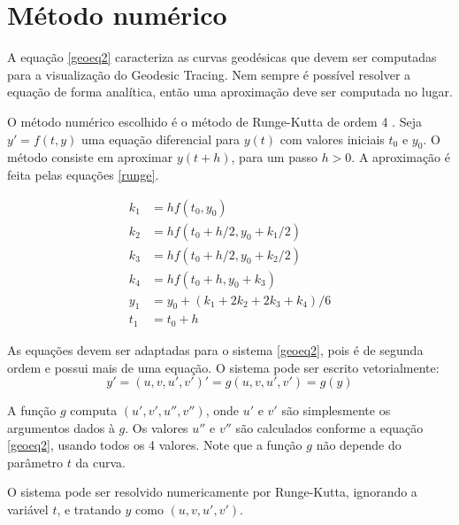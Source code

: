 \chapter{Método numérico}
\label{numeric}

A equação \ref{geoeq2} caracteriza as curvas geodésicas que devem ser 
computadas para a visualização do Geodesic Tracing.
Nem sempre é possível resolver a equação de forma analítica, então uma aproximação
deve ser computada no lugar.

O método numérico escolhido é o método de Runge-Kutta de ordem 4 \cite{Anal:1}.
Seja $y' = f(t, y)$ uma equação diferencial para $y(t)$ com valores iniciais $t_0$ e $y_0$.
O método consiste em aproximar $y(t+h)$, para um passo $h>0$.
A aproximação é feita pelas equações \ref{runge}.

\begin{equation}
\label{runge}
\begin{split}
k_1 & = hf(t_0, y_0) \\
k_2 & = hf(t_0 + h/2, y_0 + k_1/2) \\
k_3 & = hf(t_0 + h/2, y_0 + k_2/2) \\
k_4 & = hf(t_0 + h, y_0 + k_3) \\
y_1 & = y_0 + (k_1 + 2k_2 + 2k_3 + k_4)/6 \\
t_1 & = t_0 + h
\end{split}
\end{equation}

As equações devem ser adaptadas para o sistema \ref{geoeq2}, pois é de 
segunda ordem e possui mais de uma equação.
O sistema pode ser escrito vetorialmente:
\[y' = (u, v, u', v')' = g(u, v, u', v') = g(y)\]

A função $g$ computa $(u', v', u'', v'')$, onde $u'$ e $v'$ são simplesmente 
os argumentos dados à $g$. Os valores $u''$ e $v''$ são calculados conforme a equação
\ref{geoeq2}, usando todos os 4 valores.
Note que a função $g$ não depende do parâmetro $t$ da curva.

O sistema pode ser resolvido numericamente por Runge-Kutta, ignorando a variável $t$,
e tratando $y$ como $(u, v, u', v')$.